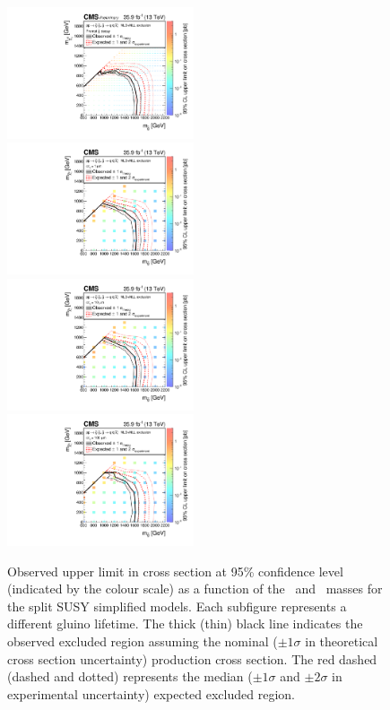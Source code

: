 \clearpage
\begin{figure}[!t]
\centering
\includegraphics[width=0.49\textwidth]{figs/results/T1qqqqLLPromptXSEC}~
\includegraphics[width=0.49\textwidth]{figs/results/T1qqqqLL0p001XSEC}\\
\includegraphics[width=0.49\textwidth]{figs/results/T1qqqqLL0p01XSEC}~
\includegraphics[width=0.49\textwidth]{figs/results/T1qqqqLL0p1XSEC}
\caption{Observed upper limit in cross section at 95\% confidence level 
(indicated by the colour scale) as a function of the \gluino~and 
\neutralino~masses for the split SUSY simplified models. Each subfigure 
represents a different gluino lifetime. The thick (thin) black line indicates 
the observed excluded region assuming the nominal ($\pm1\sigma$ in theoretical 
cross section uncertainty) production cross section. The red dashed (dashed and 
dotted) represents the median ($\pm1\sigma$ and $\pm2\sigma$ in experimental 
uncertainty) expected excluded region.}
\label{fig:limits-individual-1}
\end{figure}
